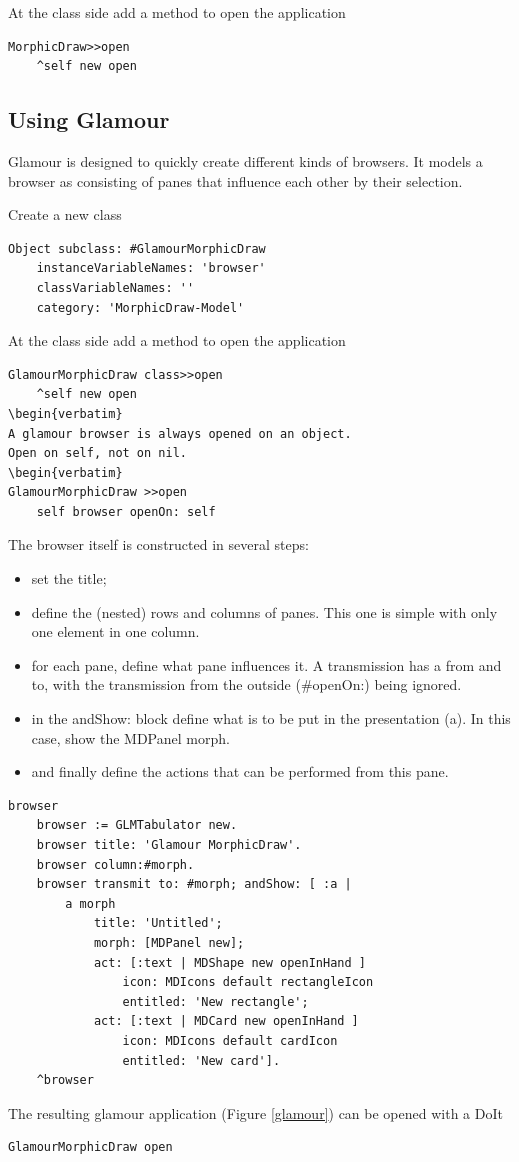 \documentclass[10pt, twoside]{article}   	%
\begin{document}
At the class side add a method to open the application

\begin{verbatim}
MorphicDraw>>open
    ^self new open
\end{verbatim}
\subsection{Using Glamour}
Glamour is designed to quickly create different kinds of browsers.
It models a browser as consisting of panes that influence each other 
by their selection. 

Create a new class
\begin{verbatim}
Object subclass: #GlamourMorphicDraw
    instanceVariableNames: 'browser'
    classVariableNames: ''
    category: 'MorphicDraw-Model' 
\end{verbatim}
At the class side add a method to open the application
\begin{verbatim}
GlamourMorphicDraw class>>open
    ^self new open
\begin{verbatim}
A glamour browser is always opened on an object. 
Open on self, not on nil.
\begin{verbatim}
GlamourMorphicDraw >>open
    self browser openOn: self
\end{verbatim}
The browser itself is constructed in several steps:
\begin{itemize}
\item set the title;
\item define the (nested) rows and columns of panes.
This one is simple with only one element in one column.
\item for each pane, define what pane influences it. 
A transmission has a from and to, with the transmission from
the outside (\#openOn:) being ignored.
\item in the andShow: block define what is to be put in the
presentation (a). In this case, show the MDPanel morph.
\item and finally define the actions that can be performed
from this pane.
\end{itemize}
\begin{verbatim}
browser
    browser := GLMTabulator new.
    browser title: 'Glamour MorphicDraw'.
    browser column:#morph.
    browser transmit to: #morph; andShow: [ :a |
        a morph 
            title: 'Untitled';
            morph: [MDPanel new];
            act: [:text | MDShape new openInHand ] 
                icon: MDIcons default rectangleIcon 
                entitled: 'New rectangle';
            act: [:text | MDCard new openInHand ] 
                icon: MDIcons default cardIcon 
                entitled: 'New card'].
    ^browser
\end{verbatim}
The resulting glamour application (Figure \ref{glamour}) can be opened with a DoIt
\begin{verbatim}
GlamourMorphicDraw open
\end{verbatim}
\end{document}

